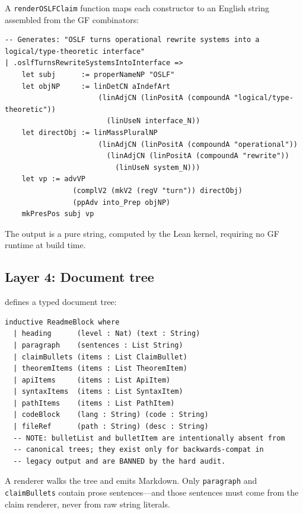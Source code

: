 \documentclass[11pt]{article}
\newcommand{\code}[1]{\texttt{#1}}
\newcommand{\codepath}[1]{\path{#1}}
\begin{document}
A \code{renderOSLFClaim} function maps each constructor to an English string
assembled from the GF combinators:

\begin{lstlisting}[caption={Renderer arm for oslfTurnsRewriteSystemsIntoInterface}]
-- Generates: "OSLF turns operational rewrite systems into a logical/type-theoretic interface"
| .oslfTurnsRewriteSystemsIntoInterface =>
    let subj      := properNameNP "OSLF"
    let objNP     := linDetCN aIndefArt
                      (linAdjCN (linPositA (compoundA "logical/type-theoretic"))
                        (linUseN interface_N))
    let directObj := linMassPluralNP
                      (linAdjCN (linPositA (compoundA "operational"))
                        (linAdjCN (linPositA (compoundA "rewrite"))
                          (linUseN system_N)))
    let vp := advVP
                (complV2 (mkV2 (regV "turn")) directObj)
                (ppAdv into_Prep objNP)
    mkPresPos subj vp
\end{lstlisting}

\noindent The output is a pure string, computed by the Lean kernel,
requiring no GF runtime at build time.

\subsection{Layer 4: Document tree}

\codepath{Mettapedia/DocText/ReadmeTree.lean} defines a typed document tree:

\begin{lstlisting}[caption={ReadmeBlock: the canonical document node type}]
inductive ReadmeBlock where
  | heading      (level : Nat) (text : String)
  | paragraph    (sentences : List String)
  | claimBullets (items : List ClaimBullet)
  | theoremItems (items : List TheoremItem)
  | apiItems     (items : List ApiItem)
  | syntaxItems  (items : List SyntaxItem)
  | pathItems    (items : List PathItem)
  | codeBlock    (lang : String) (code : String)
  | fileRef      (path : String) (desc : String)
  -- NOTE: bulletList and bulletItem are intentionally absent from
  -- canonical trees; they exist only for backwards-compat in
  -- legacy output and are BANNED by the hard audit.
\end{lstlisting}

A renderer walks the tree and emits Markdown.
Only \code{paragraph} and \code{claimBullets} contain prose sentences---and
those sentences must come from the claim renderer, never from raw string literals.
\end{document}
